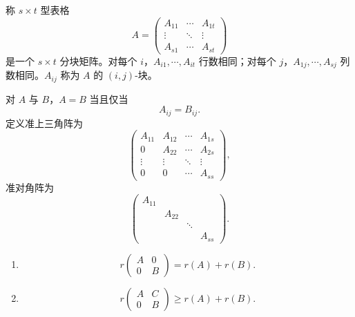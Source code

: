 \begin{definition}\label{3.5.1}
	称 $s\times t$ 型表格
	\[
	A=
	\begin{pmatrix}
		A_{11}&\cdots&A_{1t}\\
		\vdots&\ddots&\vdots\\
		A_{s1}&\cdots&A_{st}
	\end{pmatrix}
	\]
	是一个 $s\times t$ 分块矩阵。对每个 $i$，$A_{i1},\cdots,A_{it}$ 行数相同；对每个 $j$，$A_{1j},\cdots,A_{sj}$ 列数相同。$A_{ij}$ 称为 $A$ 的 $(i,j)$-块。
	
	对 $A$ 与 $B$，$A=B$ 当且仅当
	\[
	A_{ij}=B_{ij}.
	\]
	定义准上三角阵为
	\[
	\begin{pmatrix}
		A_{11}&A_{12}&\cdots&A_{1s}\\
		0&A_{22}&\cdots&A_{2s}\\
		\vdots&\vdots&\ddots&\vdots\\
		0&0&\cdots&A_{ss}
	\end{pmatrix},
	\]
	准对角阵为
	\[
	\begin{pmatrix}
		A_{11}&&&\\
		&A_{22}&&\\
		&&\ddots&\\
		&&&A_{ss}
	\end{pmatrix}.
	\]
\end{definition}

\begin{proposition}\label{3.5.2}
	\begin{enumerate}
		\item
		\[
		r\begin{pmatrix}
			A&0\\
			0&B
		\end{pmatrix}=r(A)+r(B).
		\]
		\item
		\[
		r\begin{pmatrix}
			A&C\\
			0&B
		\end{pmatrix}\geq r(A)+r(B).
		\]
	\end{enumerate}
\end{proposition}

